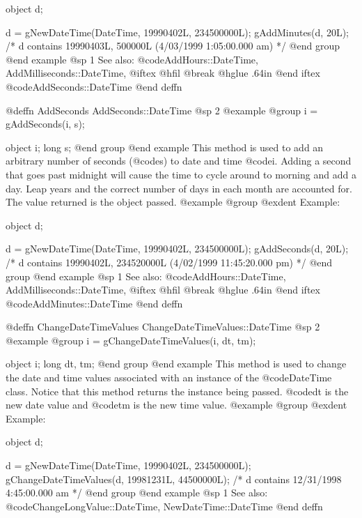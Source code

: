 object  d;

d = gNewDateTime(DateTime, 19990402L, 234500000L);
gAddMinutes(d, 20L);
/*  d contains 19990403L, 500000L
    (4/03/1999 1:05:00.000 am) */
@end group
@end example
@sp 1
See also:  @code{AddHours::DateTime, AddMilliseconds::DateTime,}
@iftex
@hfil @break @hglue .64in      
@end iftex
@code{AddSeconds::DateTime}
@end deffn











@deffn {AddSeconds} AddSeconds::DateTime
@sp 2
@example
@group
i = gAddSeconds(i, s);

object  i;
long    s;
@end group
@end example
This method is used to add an arbitrary number of seconds (@code{s}) to
date and time @code{i}.  Adding a second that goes past midnight will cause
the time to cycle around to morning and add a day.  Leap years and the correct
number of days in each month are accounted for.  The value returned is the
object passed.
@example
@group
@exdent Example:

object  d;

d = gNewDateTime(DateTime, 19990402L, 234500000L);
gAddSeconds(d, 20L);
/*  d contains 19990402L, 234520000L
    (4/02/1999 11:45:20.000 pm) */
@end group
@end example
@sp 1
See also:  @code{AddHours::DateTime, AddMilliseconds::DateTime,}
@iftex
@hfil @break @hglue .64in      
@end iftex
@code{AddMinutes::DateTime}
@end deffn










@deffn {ChangeDateTimeValues} ChangeDateTimeValues::DateTime
@sp 2
@example
@group
i = gChangeDateTimeValues(i, dt, tm);

object  i;
long    dt, tm;
@end group
@end example
This method is used to change the date and time values associated
with an instance of the @code{DateTime} class.  Notice that this method
returns the instance being passed.  @code{dt} is the new date value and
@code{tm} is the new time value.
@example
@group
@exdent Example:

object  d;

d = gNewDateTime(DateTime, 19990402L, 234500000L);
gChangeDateTimeValues(d, 19981231L, 44500000L);
/*  d contains 12/31/1998 4:45:00.000 am  */
@end group
@end example
@sp 1
See also:  @code{ChangeLongValue::DateTime, NewDateTime::DateTime}
@end deffn










